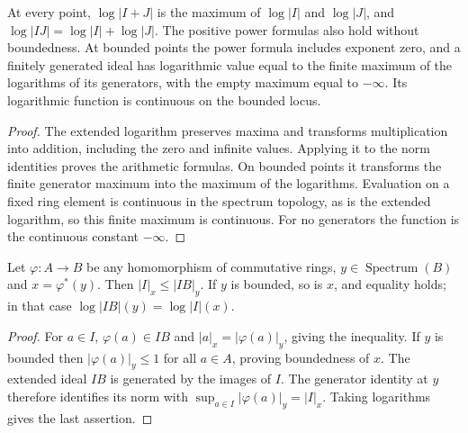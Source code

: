 \begin{lemma}
\label{lem:general-ideal-log}
\leanok
{}
At every point, $\log|I+J|$ is the maximum of $\log|I|$ and
$\log|J|$, and $\log|IJ|=\log|I|+\log|J|$. The positive power
formulas also hold without boundedness. At bounded points the power
formula includes exponent zero, and a finitely generated ideal has
logarithmic value equal to the finite maximum of the logarithms of its
generators, with the empty maximum equal to $-\infty$. Its logarithmic
function is continuous on the bounded locus.
\end{lemma}
\begin{proof}
The extended logarithm preserves maxima and transforms multiplication
into addition, including the zero and infinite values. Applying it to
the norm identities proves the arithmetic formulas. On bounded points
it transforms the finite generator maximum into the maximum of the
logarithms. Evaluation on a fixed ring element is continuous in the
spectrum topology, as is the extended logarithm, so this finite maximum
is continuous. For no generators the function is the continuous constant
$-\infty$.
\end{proof}

\begin{lemma}
\label{lem:general-ideal-pullback}
\leanok
{}
Let $\varphi\colon A\to B$ be any homomorphism of commutative rings,
$y\in\operatorname{Spectrum}(B)$ and $x=\varphi^*(y)$. Then
$|I|_x\le|IB|_y$. If $y$ is bounded, so is $x$, and equality holds;
in that case $\log|IB|(y)=\log|I|(x)$.
\end{lemma}
\begin{proof}
For $a\in I$, $\varphi(a)\in IB$ and
$|a|_x=|\varphi(a)|_y$, giving the inequality. If $y$ is bounded then
$|\varphi(a)|_y\le1$ for all $a\in A$, proving boundedness of $x$.
The extended ideal $IB$ is generated by the images of $I$. The generator
identity at $y$ therefore identifies its norm with
$\sup_{a\in I}|\varphi(a)|_y=|I|_x$. Taking logarithms gives the
last assertion.
\end{proof}
